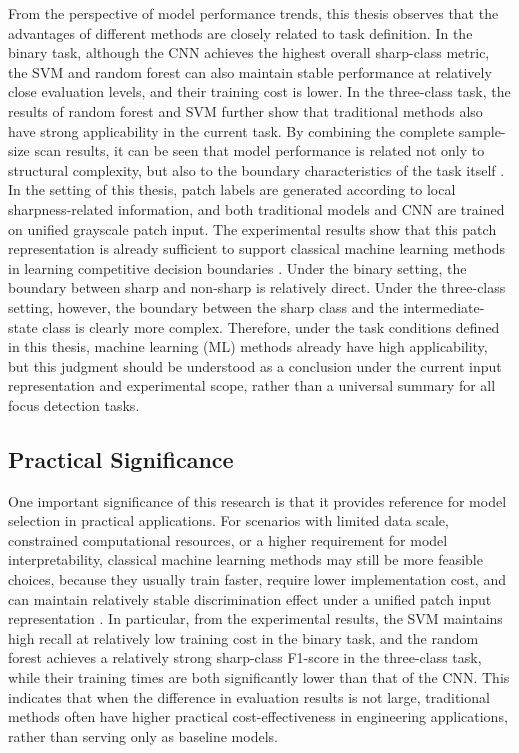 \par From the perspective of model performance trends, this thesis observes that
the advantages of different methods are closely related to task definition. In
the binary task, although the CNN achieves the highest overall sharp-class
metric, the SVM and random forest can also maintain stable performance at
relatively close evaluation levels, and their training cost is lower. In the
three-class task, the results of random forest and SVM further show that
traditional methods also have strong applicability in the current task. By
combining the complete sample-size scan results, it can be seen that model
performance is related not only to structural complexity, but also to the
boundary characteristics of the task itself \cite{murphy2022pml}. In the setting of this thesis,
patch labels are generated according to local sharpness-related information, and
both traditional models and CNN are trained on unified grayscale patch input.
The experimental results show that this patch representation is already
sufficient to support classical machine learning methods in learning competitive
decision boundaries \cite{pertuz2013analysis,5739529,yi2016lbp}. Under the binary setting, the boundary between sharp and
non-sharp is relatively direct. Under the three-class setting, however, the
boundary between the sharp class and the intermediate-state class is clearly
more complex. Therefore, under the task conditions defined in this thesis,
machine learning (ML) methods already have high applicability, but this judgment
should be understood as a conclusion under the current input representation and
experimental scope, rather than a universal summary for all focus detection
tasks.

\subsection{Practical Significance}
\par One important significance of this research is that it provides reference
for model selection in practical applications. For scenarios with limited data
scale, constrained computational resources, or a higher requirement for model
interpretability, classical machine learning methods may still be more feasible
choices, because they usually train faster, require lower implementation cost,
and can maintain relatively stable discrimination effect under a unified patch
input representation \cite{murphy2022pml,cortes1995support,breiman2001random}. In particular, from the experimental
results, the SVM maintains high recall at relatively low training cost in the
binary task, and the random forest achieves a relatively strong sharp-class
F1-score in the three-class task, while their training times are both
significantly lower than that of the CNN. This indicates that when the
difference in evaluation results is not large, traditional methods often have
higher practical cost-effectiveness in engineering applications, rather than
serving only as baseline models.

